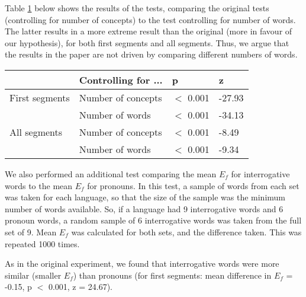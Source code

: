 \documentclass[10pt,a4paper,landscape]{article}
\begin{document}
Table \ref{tab:ControlNRes} below shows the results of the tests, comparing the original tests (controlling for number of concepts) to the test controlling for number of words.  The latter results in a more extreme result than the original (more in favour of our hypothesis), for both first segments and all segments.  Thus, we argue that the results in the paper are not driven by comparing different numbers of words.

\begin{table}[htdp]
\begin{center}
\begin{tabular}{llll}
\hline
& Controlling for ... & p & z \\
\hline
First segments & Number of concepts & $< $ 0.001 & -27.93 \\
 & Number of words & $<$  0.001 & -34.13 \\
All segments & Number of concepts & $<$  0.001 & -8.49 \\
 & Number of words & $<$  0.001 & -9.34 \\
\end{tabular}
\end{center}
\label{tab:ControlNRes}
\end{table}%

We also performed an additional test comparing the mean $E_f$ for interrogative words to the mean $E_f$ for pronouns.  In this test, a sample of words from each set was taken for each language, so that the size of the sample was the minimum number of words available.  So, if a language had 9 interrogative words and 6 pronoun words, a random sample of 6 interrogative words was taken from the full set of 9.  Mean $E_f$ was calculated for both sets, and the difference taken. This was repeated 1000 times.  

As in the original experiment, we found that interrogative words were more similar (smaller $E_f$) than pronouns (for first segments: mean difference in $E_f$ = -0.15, p $<$ 0.001, z = 24.67).



\end{document}
